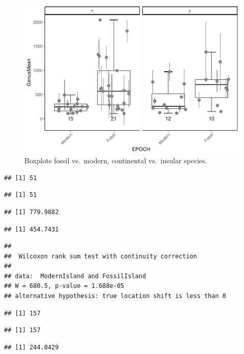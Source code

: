 \documentclass[]{article}
\begin{document}
\begin{figure}[htbp]
\centering
\includegraphics{MA_JJ_files/figure-latex/Boxplots fossil vs. modern, continental vs. insular-1.pdf}
\caption{Boxplots fossil vs.~modern, continental vs.~insular species.}
\end{figure}

\begin{verbatim}
## [1] 51
\end{verbatim}

\begin{verbatim}
## [1] 51
\end{verbatim}

\begin{verbatim}
## [1] 779.9882
\end{verbatim}

\begin{verbatim}
## [1] 454.7431
\end{verbatim}

\begin{verbatim}
## 
##  Wilcoxon rank sum test with continuity correction
## 
## data:  ModernIsland and FossilIsland
## W = 680.5, p-value = 1.688e-05
## alternative hypothesis: true location shift is less than 0
\end{verbatim}

\begin{verbatim}
## [1] 157
\end{verbatim}

\begin{verbatim}
## [1] 157
\end{verbatim}

\begin{verbatim}
## [1] 244.0429
\end{verbatim}
\end{document}
